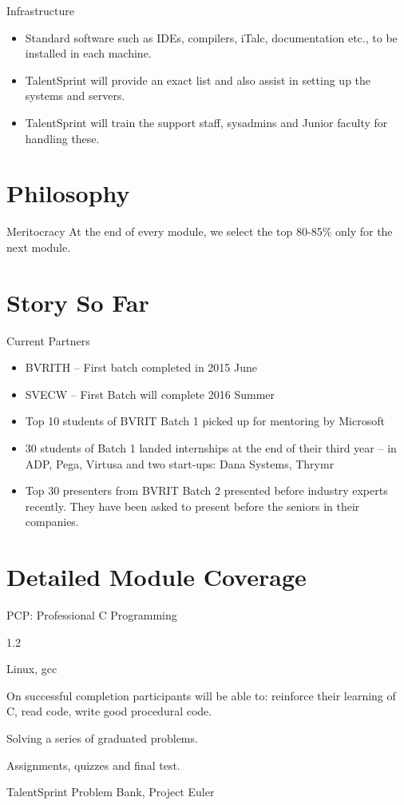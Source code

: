 \documentclass[12pt]{beamer}
\begin{document}
{\begin{frame}{Infrastructure}
\begin{itemize} 
  \item Standard software such as IDEs, compilers, iTalc, documentation etc., to be installed in each machine.
    \item TalentSprint will provide an exact list and also assist in setting up the systems and servers. 
    \item TalentSprint will train the support staff, sysadmins and Junior faculty for handling these.
  \end{itemize}
\end{frame}

\section{Philosophy}
\begin{frame}{Meritocracy}
	At the end of every module, we select the top 80-85\% only for the next module.
\end{frame}
\section{Story So Far}
\begin{frame}{Current Partners}
	\begin{itemize}
		\item BVRITH -- First batch completed in 2015 June
		\item SVECW -- First Batch will complete 2016 Summer
		\item Top 10 students of BVRIT Batch 1 picked up for mentoring by Microsoft
		\item 30 students of Batch 1 landed internships at the end of their third year -- in ADP, Pega, Virtusa and two start-ups: Dana Systems, Thrymr
		\item Top 30 presenters from BVRIT Batch 2 presented before industry experts recently. They have been asked to present before the seniors in their companies.
	\end{itemize}
\end{frame}

\section{Detailed Module Coverage}
\begin{frame}{PCP: Professional C Programming}
  \begin{description}[Resource(S)]
  \item[Slot] 1.2 
  \item[Platform] Linux, gcc
  \item[Objectives] On successful completion participants will be able to: reinforce their learning of C, read code, write good procedural code.
  \item[Pedagogy] Solving a series of graduated problems.
  \item[Assessment] Assignments, quizzes and final test.
  \item[Resource(s)] TalentSprint Problem Bank, Project Euler
  \end{description}
\end{frame}

}
\end{document}
